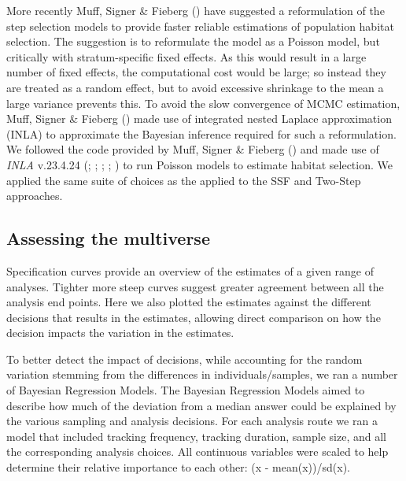 \documentclass[10pt,a4paper]{article}
\begin{document}
More recently Muff, Signer \& Fieberg () have suggested a reformulation of the step selection models to provide faster reliable estimations of population habitat selection.
The suggestion is to reformulate the model as a Poisson model, but critically with stratum-specific fixed effects.
As this would result in a large number of fixed effects, the computational cost would be large; so instead they are treated as a random effect, but to avoid excessive shrinkage to the mean a large variance prevents this.
To avoid the slow convergence of MCMC estimation, Muff, Signer \& Fieberg () made use of integrated nested Laplace approximation (INLA) to approximate the Bayesian inference required for such a reformulation.
We followed the code provided by Muff, Signer \& Fieberg () and made use of \emph{INLA} v.23.4.24 (; ; ; ; ) to run Poisson models to estimate habitat selection.
We applied the same suite of choices as the applied to the SSF and Two-Step approaches.

\subsection{Assessing the multiverse}\label{assessing-the-multiverse}

Specification curves provide an overview of the estimates of a given range of analyses.
Tighter more steep curves suggest greater agreement between all the analysis end points.
Here we also plotted the estimates against the different decisions that results in the estimates, allowing direct comparison on how the decision impacts the variation in the estimates.

To better detect the impact of decisions, while accounting for the random variation stemming from the differences in individuals/samples, we ran a number of Bayesian Regression Models.
The Bayesian Regression Models aimed to describe how much of the deviation from a median answer could be explained by the various sampling and analysis decisions.
For each analysis route we ran a model that included tracking frequency, tracking duration, sample size, and all the corresponding analysis choices.
All continuous variables were scaled to help determine their relative importance to each other: (x - mean(x))/sd(x).
\end{document}
